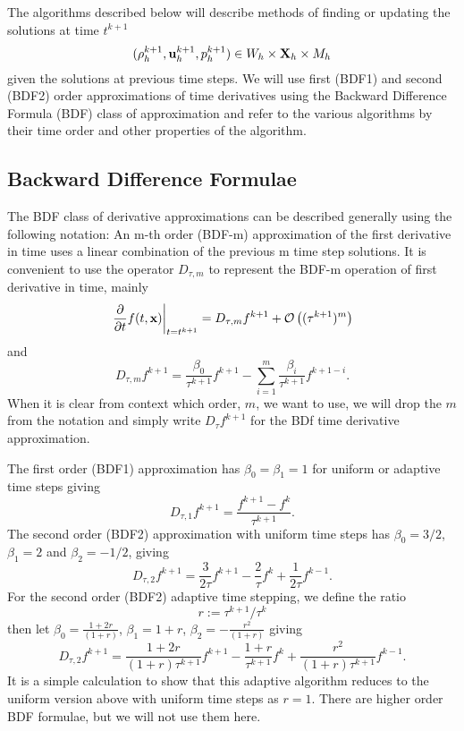 \documentclass[letterpaper]{erdc}
\begin{document}
The algorithms described below will describe methods of finding or updating the solutions at time $t^{k+1}$
\begin{equation}(\rho^{k+1}_h, \textbf{u}^{k+1}_{h}, p^{k+1}_h) \in W_h\times\textbf{X}_h\times M_h  \end{equation}
given the solutions at previous time steps.  We will use first (BDF1) and second (BDF2) order approximations of time derivatives using the Backward Difference Formula (BDF) class of approximation and refer to the various algorithms by their time order and other properties of the algorithm.

\subsection{Backward Difference Formulae}
The BDF class of derivative approximations can be described generally using the following notation: An m-th order (BDF-m) approximation of the first derivative in time  uses a linear combination of the previous m time step solutions. It is convenient to use the operator $D_{\tau,m}$ to represent the BDF-m operation of first derivative in time, mainly
\begin{equation}
 \left.\frac{\partial}{\partial t}f(t,\textbf{x})\right|_{t=t^{k+1}} =  D_{\tau,m}f^{k+1} + \mathcal{O}\left((\tau^{k+1})^m\right)
\end{equation}
and
\begin{equation}
  D_{\tau,m}f^{k+1} =  \frac{\beta_0}{\tau^{k+1}}f^{k+1} - \displaystyle\sum_{i=1}^{m} \frac{\beta_{i}}{\tau^{k+1}} f^{k+1-i}.
\end{equation}
When it is clear from context which order, $m$, we want to use, we will drop the $m$ from the notation and simply write $D_{\tau}f^{k+1}$ for the BDf time derivative approximation.


The first order (BDF1) approximation has $\beta_0 = \beta_1 = 1$ for uniform or adaptive time steps giving
\begin{equation}
  D_{\tau,1} f^{k+1} = \frac{f^{k+1} - f^{k}}{\tau^{k+1}}.
\end{equation}
The second order (BDF2) approximation with uniform time steps has $\beta_0 = 3/2$, $\beta_1 = 2$ and $\beta_2 = -1/2$, giving
\begin{equation}  
  D_{\tau,2} f^{k+1} = \frac{3}{2\tau}f^{k+1} - \frac{2}{\tau}f^{k} + \frac{1}{2\tau}f^{k-1}.
\end{equation}
For the second order (BDF2) adaptive time stepping, we define the ratio
\begin{equation}
  r:=\tau^{k+1}/\tau^{k}
\end{equation}
then let $\beta_0 = \frac{1+2r}{(1+r)}$, $\beta_1 = 1+r$, $\beta_2 = -\frac{r^2}{(1+r)}$ giving
\begin{equation}  
  D_{\tau,2} f^{k+1} = \frac{1+2r}{(1+r)\tau^{k+1}}f^{k+1} - \frac{1+r}{\tau^{k+1}}f^{k} + \frac{r^2}{(1+r)\tau^{k+1}}f^{k-1}.
\end{equation}
It is a simple calculation to show that this adaptive algorithm reduces to the uniform version above with uniform time steps as $r=1$.  There are higher order BDF formulae, but we will not use them here.
\end{document}

